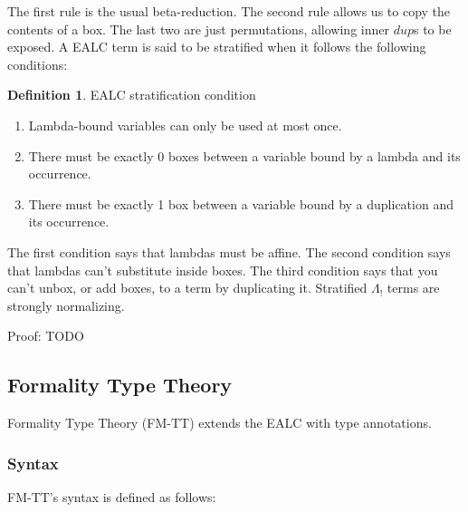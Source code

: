 \documentclass{article}
\theoremstyle{definition}
\newtheorem{definition}{Definition}
\theoremstyle{theorem}
\begin{document}
The first rule is the usual beta-reduction. The second rule allows us to copy
the contents of a box. The last two are just permutations, allowing inner $dup$s
to be exposed. A EALC term is said to be stratified when it follows the
following conditions:

\begin{definition} EALC stratification condition
\begin{enumerate}
\item Lambda-bound variables can only be used at most once.
\item There must be exactly 0 boxes between a variable bound by a lambda and its
   occurrence.
\item There must be exactly 1 box between a variable bound by a duplication and its
   occurrence.
\end{enumerate}
\end{definition}

The first condition says that lambdas must be affine. The second condition says
that lambdas can't substitute inside boxes. The third condition says that you
can't unbox, or add boxes, to a term by duplicating it. Stratified $\Lambda_!$
terms are strongly normalizing. 

Proof: TODO

\subsection{Formality Type Theory}

Formality Type Theory (FM-TT) extends the EALC with type annotations.

\subsubsection{Syntax}
FM-TT's syntax is defined as follows:
\end{document}
